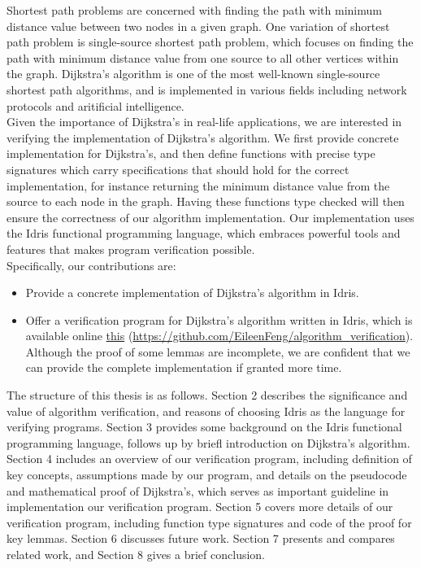 
Shortest path problems are concerned with finding the path with minimum distance value between two nodes in a given graph. One variation of shortest path problem is single-source shortest path problem, which focuses on finding the path with minimum distance value from one source to all other vertices within the graph. Dijkstra's algorithm \cite{Dijkstras} is one of the most well-known single-source shortest path algorithms, and is implemented in various fields including network protocols and aritificial intelligence.
\\

Given the importance of Dijkstra's in real-life applications, we are interested in verifying the implementation of Dijkstra's algorithm. We first provide concrete implementation for Dijkstra's, and then define functions with precise type signatures which carry specifications that should hold for the correct implementation, for instance returning the minimum distance value from the source to each node in the graph. Having these functions type checked will then ensure the correctness of our algorithm implementation. Our implementation uses the Idris functional programming language, which embraces powerful tools and features that makes program verification possible. 
\\

Specifically, our contributions are:
\begin{itemize}
	\item Provide a concrete implementation of Dijkstra's algorithm in Idris. 
	\item Offer a verification program for Dijkstra's algorithm written in Idris, which is available online \href{https://github.com/EileenFeng/algorithm_verification}{this} (\url{https://github.com/EileenFeng/algorithm_verification}). Although the proof of some lemmas are incomplete, we are confident that we can provide the complete implementation if granted more time.

\end{itemize}

The structure of this thesis is as follows. Section 2 describes the significance and value of algorithm verification, and reasons of choosing Idris as the language for verifying programs. Section 3 provides some background on the Idris functional programming language, follows up by briefl introduction on Dijkstra's algorithm. Section 4 includes an overview of our verification program, including definition of key concepts, assumptions made by our program, and details on the pseudocode and mathematical proof of Dijkstra's, which serves as important guideline in implementation our verification program. Section 5 covers more details of our verification program, including function type signatures and code of the proof for key lemmas. Section 6 discusses future work. Section 7 presents and compares related work, and Section 8 gives a brief conclusion.  